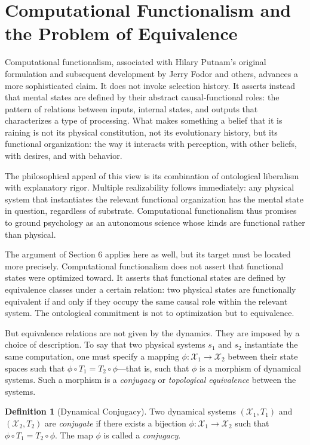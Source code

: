 \documentclass[12pt, a4paper, oneside]{article}
\theoremstyle{plain}
\theoremstyle{definition}
\newtheorem{definition}[theorem]{Definition}
\theoremstyle{remark}
\newcommand{\X}{\mathcal{X}}
\newcommand{\T}{T}
\begin{document}
\section{Computational Functionalism and the Problem of Equivalence}

Computational functionalism, associated with Hilary Putnam's original formulation and subsequent development by Jerry Fodor and others, advances a more sophisticated claim. It does not invoke selection history. It asserts instead that mental states are defined by their abstract causal-functional roles: the pattern of relations between inputs, internal states, and outputs that characterizes a type of processing. What makes something a belief that it is raining is not its physical constitution, not its evolutionary history, but its functional organization: the way it interacts with perception, with other beliefs, with desires, and with behavior.

The philosophical appeal of this view is its combination of ontological liberalism with explanatory rigor. Multiple realizability follows immediately: any physical system that instantiates the relevant functional organization has the mental state in question, regardless of substrate. Computational functionalism thus promises to ground psychology as an autonomous science whose kinds are functional rather than physical.

The argument of Section 6 applies here as well, but its target must be located more precisely. Computational functionalism does not assert that functional states were optimized toward. It asserts that functional states are defined by equivalence classes under a certain relation: two physical states are functionally equivalent if and only if they occupy the same causal role within the relevant system. The ontological commitment is not to optimization but to equivalence.

But equivalence relations are not given by the dynamics. They are imposed by a choice of description. To say that two physical systems $s_1$ and $s_2$ instantiate the same computation, one must specify a mapping $\phi : \X_1 \to \X_2$ between their state spaces such that $\phi \circ \T_1 = \T_2 \circ \phi$---that is, such that $\phi$ is a morphism of dynamical systems. Such a morphism is a \emph{conjugacy} or \emph{topological equivalence} between the systems.

\begin{definition}[Dynamical Conjugacy]
Two dynamical systems $(\X_1, \T_1)$ and $(\X_2, \T_2)$ are \emph{conjugate} if there exists a bijection $\phi : \X_1 \to \X_2$ such that $\phi \circ \T_1 = \T_2 \circ \phi$. The map $\phi$ is called a \emph{conjugacy}.
\end{definition}
\end{document}

